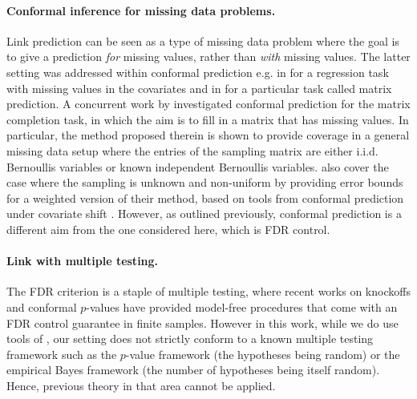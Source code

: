 \documentclass[a4paper, 11pt]{article}
\theoremstyle{remark}
\begin{document}
\paragraph{Conformal inference for missing data problems.}   
Link prediction can be seen as a type of missing data problem where the goal is to give a prediction \textit{for} missing values, rather than \textit{with} missing values. The latter setting
was addressed within conformal prediction e.g. in \cite{zaffran2023conformal} for a regression task with missing values in the covariates and in \cite{shao2023distribution} for a particular task called matrix prediction. 
A concurrent work by \cite{gui2023conformalized} investigated conformal prediction for the matrix completion task, in which the aim is to fill in a matrix that has missing values. 
In particular, the method proposed therein is shown to provide 
coverage in a general missing data setup where the entries of the sampling matrix are either i.i.d. Bernoullis variables or known independent Bernoullis variables. \cite{gui2023conformalized} also cover the case where the sampling is unknown and non-uniform by providing error bounds for a weighted version of their method, based on tools from conformal prediction under covariate shift \citep{tibshirani2019conformal}. 
However, as outlined previously, conformal prediction is a different aim from the one considered here, which is FDR control.  



\paragraph{Link with multiple testing.}
The FDR criterion is a staple of multiple testing, 
where recent works on knockoffs and conformal $p$-values \citep{barber15, weinstein2017power, bates2023testing, yang2021bonus, marandon22b} have provided model-free procedures that come with an FDR control guarantee in finite samples. However in this work, while we do use tools of \cite{bates2023testing}, our setting does not strictly conform to a known multiple testing framework such as the $p$-value framework \citep{BH1995} (the hypotheses being random) or the empirical Bayes framework \citep{efron01, sun07} (the number of hypotheses being itself random). Hence, previous theory in that area cannot be applied. 
\end{document}
